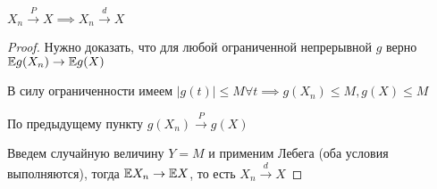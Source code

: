 \begin{corollary} 
$X_n \xrightarrow{P} X \implies X_n \xrightarrow{d} X$
\end{corollary} 

\begin{proof} 
Нужно доказать, что для любой ограниченной непрерывной $g$ верно $\mathbb{E} g(X_n) \to \mathbb{E} g(X)$ 

В силу ограниченности имеем $|g(t)| \leq M \forall t \implies g(X_n) \leq M, g(X) \leq M$

По предыдущему пункту $g(X_n) \xrightarrow{P} g(X)$

Введем случайную величину $Y = M$ и применим Лебега (оба условия выполняются), тогда $\mathbb{E} X_n \to \mathbb{E} X$, то есть
$X_n \xrightarrow{d} X$

\end{proof} 

